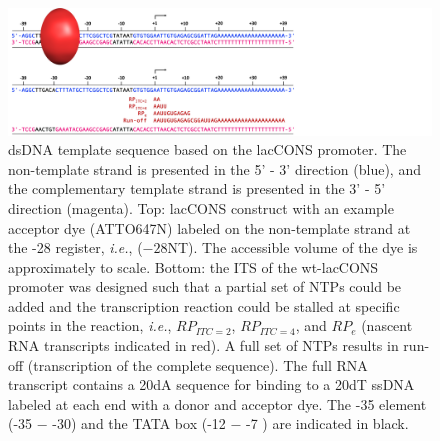 \begin{figure}
    \centering
    \includegraphics[width=1.5\textwidth]{chapters/figures/ds-lacCONS-seq.jpg}
    \caption{\label{fig:ds-lacCONS_seq} 
    \ac{dsDNA} template sequence based on the \ac{lacCONS} promoter.
    The non-template strand is presented in the 5' - 3' direction (blue), and the complementary template strand is presented in the 3' - 5' direction (magenta).
    Top: lacCONS construct with an example acceptor dye (ATTO647N) labeled on the non-template strand at the -28 register, \textit{i.e.}, ($-28$NT). 
    The accessible volume of the dye is approximately to scale.
    Bottom: the \ac{ITS} of the wt-\ac{lacCONS} promoter was designed such that a partial set of \ac{NTP}s could be added and the transcription reaction could be stalled at specific points in the reaction, \textit{i.e.}, $RP_{ITC=2}$, $RP_{ITC=4}$, and $RP_{e}$ (nascent RNA transcripts indicated in red).
    A full set of \ac{NTP}s results in run-off (transcription of the complete sequence).
    The full RNA transcript contains a 20dA sequence for binding to a 20dT \ac{ssDNA} labeled at each end with a donor and acceptor dye.
    The -35 element (-35 $-$ -30) and the TATA box (-12 $-$ -7 ) are indicated in black.
    }
\end{figure}

